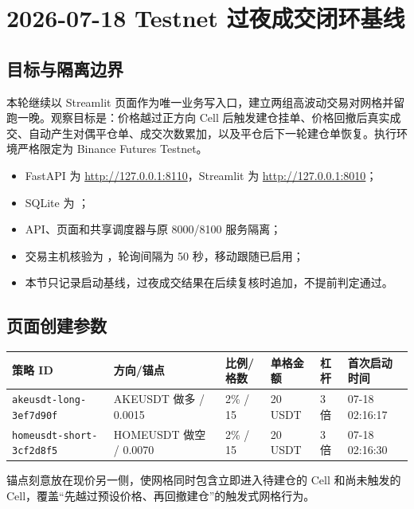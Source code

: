 \section{2026-07-18 Testnet 过夜成交闭环基线}

\subsection{目标与隔离边界}

本轮继续以 Streamlit 页面作为唯一业务写入口，建立两组高波动交易对网格并留跑一晚。观察目标是：价格越过正方向 Cell 后触发建仓挂单、价格回撤后真实成交、自动产生对偶平仓单、成交次数累加，以及平仓后下一轮建仓单恢复。执行环境严格限定为 Binance Futures Testnet。

\begin{itemize}
  \item FastAPI 为 \url{http://127.0.0.1:8110}，Streamlit 为 \url{http://127.0.0.1:8010}；
  \item SQLite 为 ；
  \item API、页面和共享调度器与原 8000/8100 服务隔离；
  \item 交易主机核验为 ，轮询间隔为 50 秒，移动跟随已启用；
  \item 本节只记录启动基线，过夜成交结果在后续复核时追加，不提前判定通过。
\end{itemize}

\subsection{页面创建参数}

\begin{longtable}{p{3.0cm}p{2.5cm}p{2.0cm}p{1.8cm}p{1.5cm}p{2.2cm}}
  \toprule
  策略 ID & 方向/锚点 & 比例/格数 & 单格金额 & 杠杆 & 首次启动时间 \\
  \midrule
  \endhead
  \texttt{akeusdt-long-}\linebreak\texttt{3ef7d90f} & AKEUSDT 做多 / 0.0015 & 2\% / 15 & 20 USDT & 3 倍 & 07-18 02:16:17 \\
  \texttt{homeusdt-short-}\linebreak\texttt{3cf2d8f5} & HOMEUSDT 做空 / 0.0070 & 2\% / 15 & 20 USDT & 3 倍 & 07-18 02:16:30 \\
  \bottomrule
\end{longtable}

锚点刻意放在现价另一侧，使网格同时包含立即进入待建仓的 Cell 和尚未触发的 Cell，覆盖“先越过预设价格、再回撤建仓”的触发式网格行为。

